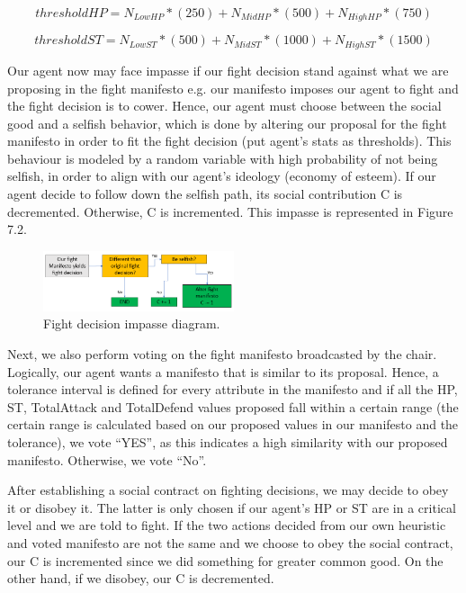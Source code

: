 \begin{equation}  
thresholdHP = N_{LowHP}*(250) + N_{MidHP}*(500) + N_{HighHP}*(750)
\label{eq:equation}
\end{equation}

\begin{equation}  
thresholdST = N_{LowST}*(500) + N_{MidST}*(1000) + N_{HighST}*(1500)
\label{eq:equation}
\end{equation}

\par Our agent now may face impasse if our fight decision stand against what we are proposing in the fight manifesto e.g. our manifesto imposes our agent to fight and the fight decision is to cower. Hence, our agent must choose between the social good and a selfish behavior, which is done by altering our proposal for the fight manifesto in order to fit the fight decision (put agent's stats as thresholds). This behaviour is modeled by a random variable with high probability of not being selfish, in order to align with our agent's ideology (economy of esteem). If our agent decide to follow down the selfish path, its social contribution C is decremented. Otherwise, C is incremented. This impasse is represented in Figure 7.2.

\begin{figure}
    \centering
    \includegraphics[width=0.5\textwidth]{007_team_4_agent_design/figures/2_fight2.png}
    \caption{Fight decision impasse diagram.}
    \label{fig:proj_struct}
\end{figure}

\par Next, we also perform voting on the fight manifesto broadcasted by the chair. Logically, our agent wants a manifesto that is similar to its proposal. 
Hence, a tolerance interval is defined for every attribute in the manifesto and if all the HP, ST, TotalAttack and TotalDefend values proposed fall within a certain range (the certain range is calculated based on our proposed values in our manifesto and the tolerance),  we vote “YES”, as this indicates a high similarity with our proposed manifesto. Otherwise, we vote “No”. 

\par After establishing a social contract on fighting decisions, we may decide to obey it or disobey it. The latter is only chosen if our agent's HP or ST are in a critical level and we are told to fight. If the two actions decided from our own heuristic and voted manifesto are not the same and we choose to obey the social contract, our C is incremented since we did something for greater common good. On the other hand, if we disobey, our C is decremented.
 

